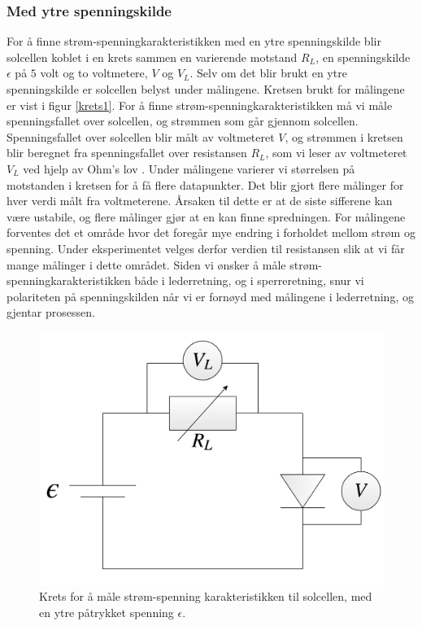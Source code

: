 \documentclass[%
 reprint,
 amsmath,amssymb,
 aps,
 norsk,
 booktabs
]{revtex4-1}
\begin{document}
\subsubsection{Med ytre spenningskilde}
For å finne strøm-spenningkarakteristikken med en ytre spenningskilde blir solcellen koblet i en krets sammen en varierende motstand $R_L$, en spenningskilde $\epsilon$ på $5$ volt og to voltmetere, $V$ og $V_L$. Selv om det blir brukt en ytre spenningskilde er solcellen belyst under målingene. Kretsen brukt for målingene er vist i figur \vref{krets1}. For å finne strøm-spenningkarakteristikken må vi måle spenningsfallet over solcellen, og strømmen som går gjennom solcellen. Spenningsfallet over solcellen blir målt av voltmeteret $V$, og strømmen i kretsen blir beregnet fra spenningsfallet over resistansen $R_L$, som vi leser av voltmeteret $V_L$ ved hjelp av Ohm's lov \cite{ohm}. Under målingene varierer vi størrelsen på motstanden i kretsen for å få flere datapunkter. Det blir gjort flere målinger for hver verdi målt fra voltmeterene. Årsaken til dette er at de siste sifferene kan være ustabile, og flere målinger gjør at en kan finne spredningen. For målingene forventes det et område hvor det foregår mye endring i forholdet mellom strøm og spenning. Under eksperimentet velges derfor verdien til resistansen slik at vi får mange målinger i dette området. Siden vi ønsker å måle strøm-spenningkarakteristikken både i lederretning, og i sperreretning, snur vi polariteten på spenningskilden når vi er fornøyd med målingene i lederretning, og gjentar prosessen.
\begin{figure}[h!]
  \centering
  \includegraphics[scale=0.15]{krets1.png}
  \caption{Krets for å måle strøm-spenning karakteristikken til solcellen, med en ytre påtrykket spenning $\epsilon$.}
  \label{krets1}
\end{figure}
\end{document}
